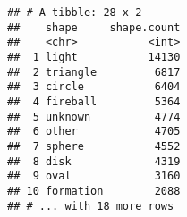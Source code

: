 \documentclass[]{article}
\begin{document}
\begin{verbatim}
## # A tibble: 28 x 2
##    shape     shape.count
##    <chr>           <int>
##  1 light           14130
##  2 triangle         6817
##  3 circle           6404
##  4 fireball         5364
##  5 unknown          4774
##  6 other            4705
##  7 sphere           4552
##  8 disk             4319
##  9 oval             3160
## 10 formation        2088
## # ... with 18 more rows
\end{verbatim}
\end{document}
